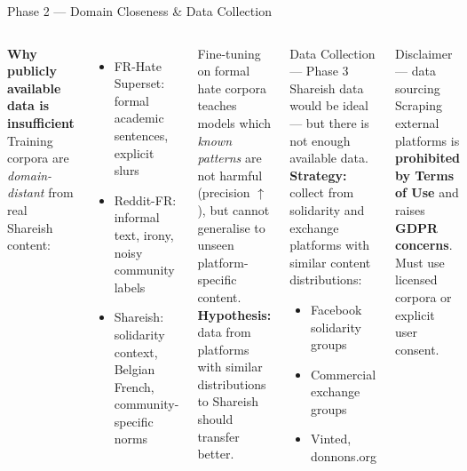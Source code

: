\documentclass[aspectratio=169, 12pt]{beamer}
\begin{document}
\begin{frame}[shrink=25]{Phase 2 — Domain Closeness \& Data Collection}
  \begin{columns}[T]
      \textbf{Why publicly available data is insufficient}\\[4pt]
      \small
      Training corpora are \emph{domain-distant} from real Shareish content:
      \begin{itemize}
        \item FR-Hate Superset: formal academic sentences, explicit slurs
        \item Reddit-FR: informal text, irony, noisy community labels
        \item Shareish: solidarity context, Belgian French, community-specific norms
      \end{itemize}
      \vspace{4pt}
      Fine-tuning on formal hate corpora teaches models which \emph{known patterns} are not harmful (precision $\uparrow$), but cannot generalise to unseen platform-specific content.\\[4pt]
      \textbf{Hypothesis:} data from platforms with similar distributions to Shareish should transfer better.

      \begin{block}{Data Collection — Phase 3}
        \small
        Shareish data would be ideal — but there is not enough available data.\\[4pt]
        \textbf{Strategy:} collect from solidarity and exchange platforms with similar content distributions:
        \begin{itemize}
          \item Facebook solidarity groups
          \item Commercial exchange groups
          \item Vinted, donnons.org
        \end{itemize}
      \end{block}
      \vspace{4pt}
      \begin{alertblock}{\small Disclaimer — data sourcing}
        \small Scraping external platforms is \textbf{prohibited by Terms of Use} and raises \textbf{GDPR concerns}.
        Must use licensed corpora or explicit user consent.
      \end{alertblock}
  \end{columns}
\end{frame}
\end{document}
